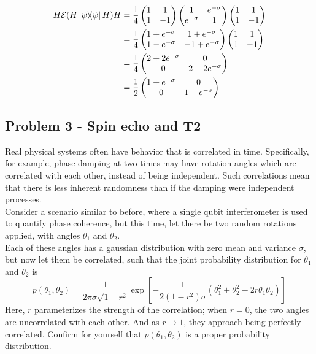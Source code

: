 \begin{align}
    H \mathcal{E}(H\ketbra{\psi}H) H &= \frac{1}{4} \begin{pmatrix}1 & 1 \\ 1 & -1\end{pmatrix} \begin{pmatrix} 1 & e^{-\sigma} \\ e^{-\sigma} & 1 \end{pmatrix} \begin{pmatrix}1 & 1 \\ 1 & -1\end{pmatrix} \\
    &= \frac{1}{4} \begin{pmatrix}1+e^{-\sigma} & 1+e^{-\sigma} \\ 1-e^{-\sigma} & -1+e^{-\sigma}\end{pmatrix} \begin{pmatrix}1 & 1 \\ 1 & -1\end{pmatrix} \\
    &= \frac{1}{4} \begin{pmatrix}2+2e^{-\sigma} & 0 \\ 0 & 2-2e^{-\sigma}\end{pmatrix} \\
    &= \frac{1}{2} \begin{pmatrix}1+e^{-\sigma} & 0 \\ 0 & 1-e^{-\sigma}\end{pmatrix}
\end{align}


\newpage
\subsection{Problem 3 - Spin echo and T2}
Real physical systems often have behavior that is correlated in time. Specifically, for example, phase damping at two times may have rotation angles which are correlated with each other, instead of being independent. Such correlations mean that there is less inherent randomness than if the damping were independent processes. \\

Consider a scenario similar to before, where a single qubit interferometer is used to quantify phase coherence, but this time, let there be two random rotations applied, with angles $\theta_1$ and $\theta_2$. \\

Each of these angles has a gaussian distribution with zero mean and variance $\sigma$, but now let them be correlated, such that the joint probability distribution for $\theta_1$ and $\theta_2$ is
\begin{equation}
    p(\theta_1, \theta_2) = \frac{1}{2\pi \sigma \sqrt{1-r^2}} \exp\left[-\frac{1}{2(1-r^2)\sigma} (\theta_1^2 + \theta_2^2 - 2r\theta_1\theta_2)\right]
\end{equation}
Here, $r$ parameterizes the strength of the correlation; when $r=0$, the two angles are uncorrelated with each other. And as $r \rightarrow 1$, they approach being perfectly correlated. Confirm for yourself that $p(\theta_1,\theta_2)$ is a proper probability distribution. \\

